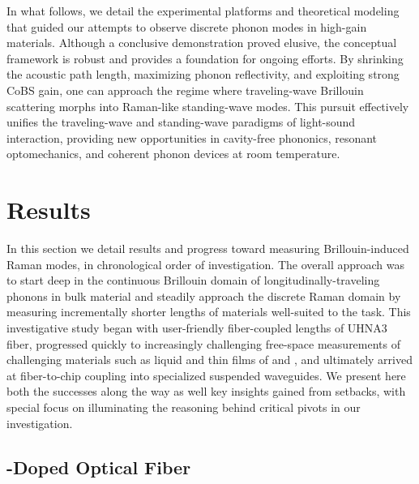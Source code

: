 In what follows, we detail the experimental platforms and theoretical modeling that guided our attempts to observe discrete phonon modes in high-gain materials. Although a conclusive demonstration proved elusive, the conceptual framework is robust and provides a foundation for ongoing efforts. By shrinking the acoustic path length, maximizing phonon reflectivity, and exploiting strong \ac{CoBS} gain, one can approach the regime where traveling-wave Brillouin scattering morphs into Raman-like standing-wave modes. This pursuit effectively unifies the traveling-wave and standing-wave paradigms of light-sound interaction, providing new opportunities in cavity-free phononics, resonant optomechanics, and coherent phonon devices at room temperature.


\section{Results}
\label{sec:Raman:Results}

In this section we detail results and progress toward measuring Brillouin-induced Raman modes, in chronological order of investigation. The overall approach was to start deep in the continuous Brillouin domain of longitudinally-traveling phonons in bulk material and steadily approach the discrete Raman domain by measuring incrementally shorter lengths of materials well-suited to the task. This investigative study began with user-friendly fiber-coupled lengths of \ac{UHNA3} fiber, progressed quickly to increasingly challenging free-space measurements of challenging materials such as liquid  and thin films of  and , and ultimately arrived at fiber-to-chip coupling into specialized suspended waveguides. We present here both the successes along the way as well key insights gained from setbacks, with special focus on illuminating the reasoning behind critical pivots in our investigation.

\subsection{\texorpdfstring{}{Ge}-Doped Optical Fiber}
\label{subsec:Raman:Target:UHNA3}

